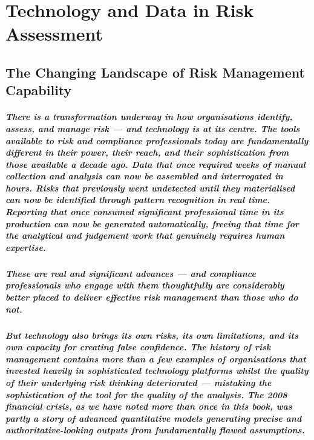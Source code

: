 \chapter{Technology and Data in Risk Assessment}
\label{chap:Technology and Data in Risk Assessment}

\section{The Changing Landscape of Risk Management Capability}
\paragraph{There is a transformation underway in how organisations identify, assess, and manage risk — and technology is at its centre. The tools available to risk and compliance professionals today are fundamentally different in their power, their reach, and their sophistication from those available a decade ago. Data that once required weeks of manual collection and analysis can now be assembled and interrogated in hours. Risks that previously went undetected until they materialised can now be identified through pattern recognition in real time. Reporting that once consumed significant professional time in its production can now be generated automatically, freeing that time for the analytical and judgement work that genuinely requires human expertise.}
\paragraph{These are real and significant advances — and compliance professionals who engage with them thoughtfully are considerably better placed to deliver effective risk management than those who do not.}
\paragraph{But technology also brings its own risks, its own limitations, and its own capacity for creating false confidence. The history of risk management contains more than a few examples of organisations that invested heavily in sophisticated technology platforms whilst the quality of their underlying risk thinking deteriorated — mistaking the sophistication of the tool for the quality of the analysis. The 2008 financial crisis, as we have noted more than once in this book, was partly a story of advanced quantitative models generating precise and authoritative-looking outputs from fundamentally flawed assumptions.}
